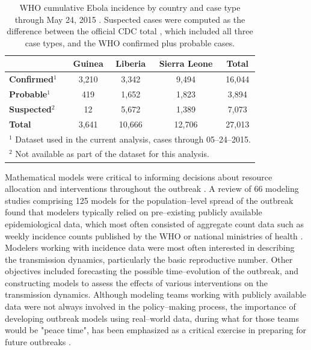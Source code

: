 \begin{table}[htbp]
	\caption[Ebola incidence by country and case type]{WHO cumulative Ebola incidence by country and case type through May 24, 2015 \cite{who2016eboladat}. Suspected cases were computed as the difference between the official CDC total \cite{cdc2016eboladat}, which included all three case types, and the WHO confirmed plus probable cases.}
	\label{tab:ebola_descriptives_intro}
	\small
	\centering
	\begin{tabular}{lcccc}	
		\hline	
		& \textbf{Guinea} & \textbf{Liberia} & \textbf{Sierra Leone} & \textbf{Total} \\\hline
		\textbf{Confirmed}$ ^1 $ & 3,210 & 3,342 & 9,494 & 16,044\\ 
		\textbf{Probable}$ ^1 $ & 419 & 1,652 & 1,823 & 3,894 \\
		\textbf{Suspected$ ^2 $} & 12 & 5,672 & 1,389 & 7,073 \\
		\hline
		\textbf{Total} & 3,641 & 10,666 & 12,706 & 27,013 \\
		\hline
		\multicolumn{5}{l}{\scriptsize $ ^1 $ Dataset used in the current analysis, cases through 05--24--2015.}\\
		\multicolumn{5}{l}{\scriptsize $ ^2 $ Not available as part of the dataset for this analysis.}\\
	\end{tabular} 
\end{table}

Mathematical models were critical to informing decisions about resource allocation and interventions throughout the outbreak \cite{coltart2017ebola}. A review of 66 modeling studies comprising 125 models for the population--level spread of the outbreak found that modelers typically relied on pre--existing publicly available epidemiological data, which most often consisted of aggregate count data such as weekly incidence counts published by the WHO or national ministries of health \cite{chretien2015mathematical}. Modelers working with incidence data were most often interested in describing the transmission dynamics, particularly the basic reproductive number. Other objectives included forecasting the possible time--evolution of the outbreak, and constructing models to assess the effects of various interventions on the transmission dynamics. Although modeling teams working with publicly available data were not always involved in the policy--making process, the importance of developing outbreak models using real--world data, during what for those teams would be "peace time", has been emphasized as a critical exercise in preparing for future outbreaks \cite{viboud2018rapidd}.

